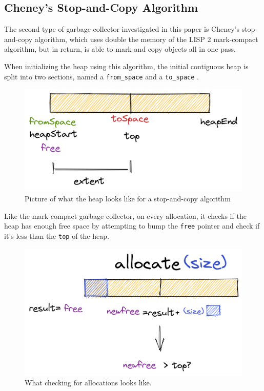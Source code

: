 \documentclass[index]{subfiles}
\begin{document}
\subsection{Cheney's Stop-and-Copy Algorithm}

The second type of garbage collector investigated in this paper is Cheney's stop-and-copy algorithm, which uses double the memory of the LISP 2 mark-compact algorithm, but in return, is able to mark and copy objects all in one pass.

When initializing the heap using this algorithm, the initial contiguous heap is split into two sections, named a \verb+from_space+ and a \verb+to_space+ \cite[Chapter~2]{gc_handbook}.

\begin{figure}[H]
    \centering
    \includegraphics[scale=0.3]{pics/split-heap-diagram.png}
    \caption{Picture of what the heap looks like for a stop-and-copy algorithm}
\end{figure}

Like the mark-compact garbage collector, on every allocation, it checks if the heap has enough free space by attempting to bump the \verb+free+ pointer and check if it's less than the \verb+top+ of the heap.

\begin{figure}[H]
    \centering
    \includegraphics[scale=0.3]{pics/allocation.png}
    \caption{What checking for allocations looks like.}
\end{figure}
\end{document}

